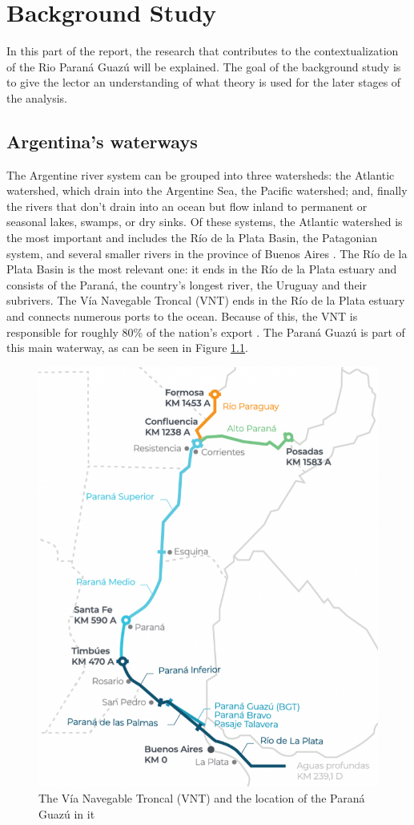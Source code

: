 \chapter{Background Study}
In this part of the report, the research that contributes to the contextualization of the Rio Paraná Guazú will be explained. The goal of the background study is to give the lector an understanding of what theory is used for the later stages of the analysis.

\section{Argentina's waterways}
The Argentine river system can be grouped into three watersheds: the Atlantic watershed, which drain into the Argentine Sea, the Pacific watershed; and, finally the rivers that don't drain into an ocean but flow inland to permanent or seasonal lakes, swamps, or dry sinks. Of these systems, the Atlantic watershed is the most important and includes the Río de la Plata Basin, the Patagonian system, and several smaller rivers in the province of Buenos Aires \autocite{marioe.farberHydrographyArgentina2024}. The Río de la Plata Basin is the most relevant one: it ends in the Río de la Plata estuary and consists of the Paraná, the country's longest river, the Uruguay and their subrivers. The Vía Navegable Troncal (VNT) ends in the Río de la Plata estuary and connects numerous ports to the ocean. Because of this, the VNT is responsible for roughly 80\% of the nation's export \autocite{NavegableTroncal2025}. The Paraná Guazú is part of this main waterway, as can be seen in Figure \ref{fig:VNT}.

\begin{figure}
    \centering
    \includegraphics[width=0.5\linewidth]{figures/2025_mapa_vnt_extendida_tramos_profundidades_abril.png}
    \caption{The Vía Navegable Troncal (VNT) and the location of the Paraná Guazú in it \autocite{NavegableTroncal2025}}
    \label{fig:VNT}
\end{figure}

